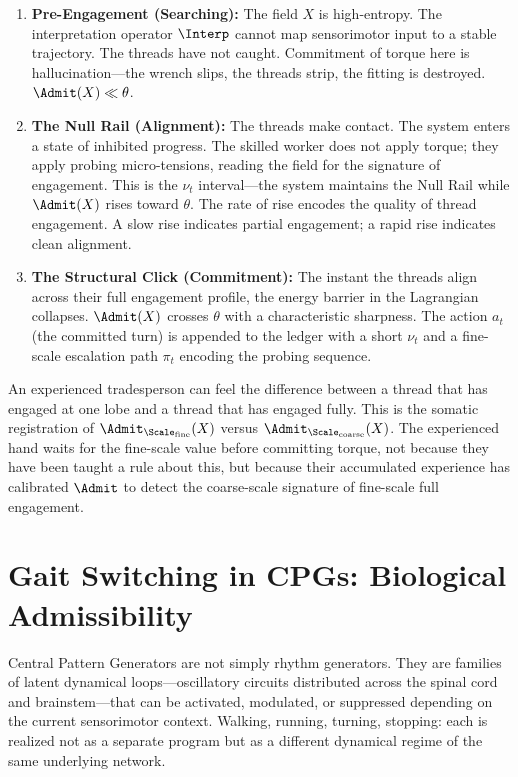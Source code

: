 \documentclass[11pt,oneside]{book}
\begin{document}
\begin{enumerate}
    \item \textbf{Pre-Engagement (Searching):} The field $X$ is high-entropy. The interpretation operator $\Interp$ cannot map sensorimotor input to a stable trajectory. The threads have not caught. Commitment of torque here is hallucination---the wrench slips, the threads strip, the fitting is destroyed. $\Admit(X) \ll \theta$.

    \item \textbf{The Null Rail (Alignment):} The threads make contact. The system enters a state of inhibited progress. The skilled worker does not apply torque; they apply probing micro-tensions, reading the field for the signature of engagement. This is the $\nu_t$ interval---the system maintains the Null Rail while $\Admit(X)$ rises toward $\theta$. The rate of rise encodes the quality of thread engagement. A slow rise indicates partial engagement; a rapid rise indicates clean alignment.

    \item \textbf{The Structural Click (Commitment):} The instant the threads align across their full engagement profile, the energy barrier in the Lagrangian collapses. $\Admit(X)$ crosses $\theta$ with a characteristic sharpness. The action $a_t$ (the committed turn) is appended to the ledger with a short $\nu_t$ and a fine-scale escalation path $\pi_t$ encoding the probing sequence.
\end{enumerate}

An experienced tradesperson can feel the difference between a thread that has engaged at one lobe and a thread that has engaged fully. This is the somatic registration of $\Admit_{\Scale_{\mathrm{fine}}}(X)$ versus $\Admit_{\Scale_{\mathrm{coarse}}}(X)$. The experienced hand waits for the fine-scale value before committing torque, not because they have been taught a rule about this, but because their accumulated experience has calibrated $\Admit$ to detect the coarse-scale signature of fine-scale full engagement.

\section{Gait Switching in CPGs: Biological Admissibility}

Central Pattern Generators are not simply rhythm generators. They are families of latent dynamical loops---oscillatory circuits distributed across the spinal cord and brainstem---that can be activated, modulated, or suppressed depending on the current sensorimotor context. Walking, running, turning, stopping: each is realized not as a separate program but as a different dynamical regime of the same underlying network.
\end{document}
